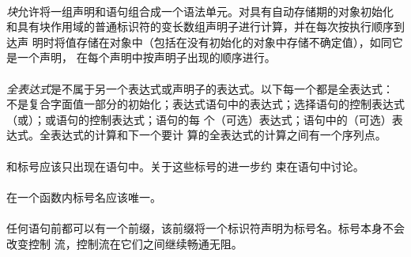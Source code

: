{\paragraph{}
\textit{块}允许将一组声明和语句组合成一个语法单元。对具有自动存储期的对象初始化
和具有块作用域的普通标识符的变长数组声明子进行计算，并在每次按执行顺序到达声
明时将值存储在对象中（包括在没有初始化的对象中存储不确定值），如同它是一个声明，
在每个声明中按声明子出现的顺序进行。

\paragraph{}
\textit{全表达式}是不属于另一个表达式或声明子的表达式。以下每一个都是全表达式：
不是复合字面值一部分的初始化；表达式语句中的表达式；选择语句的控制表达式
（或）；或语句的控制表达式；语句的每
个（可选）表达式；语句中的（可选）表达式。全表达式的计算和下一个要计
算的全表达式的计算之间有一个序列点。


\syntax
\paragraph{}

\constraint
\paragraph{}
和标号应该只出现在语句中。关于这些标号的进一步约
束在语句中讨论。

\paragraph{}
在一个函数内标号名应该唯一。

\semantic
\paragraph{}
任何语句前都可以有一个前缀，该前缀将一个标识符声明为标号名。标号本身不会改变控制
流，控制流在它们之间继续畅通无阻。


}
